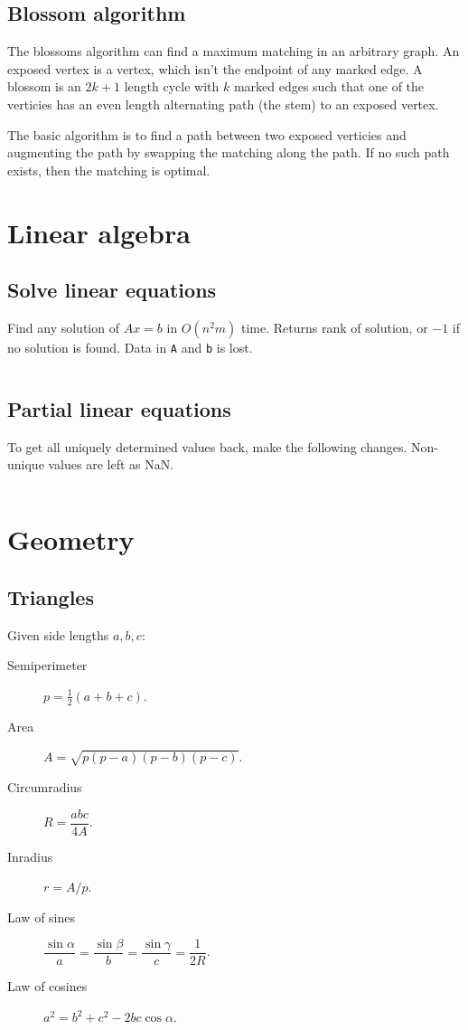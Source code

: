 \documentclass[10pt,a4paper,landscape,oneside]{amsart}
\newcommand{\code}[1]{\inputminted[fontsize=\large,tabsize=2,baselinestretch=1]{java}{#1}}
\begin{document}
\begin{multicols*}{2}
\subsection{Blossom algorithm}
The blossoms algorithm can find a maximum matching in an arbitrary graph. An exposed
vertex is a vertex, which isn't the endpoint of any marked edge. A blossom is an
\(2k+1\) length cycle with \(k\) marked edges such that one of the verticies has an even
length alternating path (the stem) to an exposed vertex.

The basic algorithm is to find a path between two exposed verticies and augmenting the
path by swapping the matching along the path. If no such path exists, then the matching
is optimal.

\section{Linear algebra}
\subsection{Solve linear equations}
Find any solution of \(Ax = b\) in \(O(n^2m)\) time. Returns rank of solution, or \(-1\)
if no solution is found. Data in \texttt{A} and \texttt{b} is lost.
\code{linear-algebra/linear-system.java}
\subsection{Partial linear equations}
To get all uniquely determined values back, make the following changes. Non-unique values
are left as NaN.
\code{linear-algebra/partial-linear-system.java}

\section{Geometry}
\subsection{Triangles}
Given side lengths \(a, b, c\):
\begin{description}
  \item[Semiperimeter] \(p = \tfrac{1}{2} (a+b+c)\).
  \item[Area] \(A = \sqrt{p (p-a)(p-b)(p-c)}\).
  \item[Circumradius] \(R = \dfrac{abc}{4A}\).
  \item[Inradius] \(r = A / p\).
  \item[Law of sines]
    \(\dfrac{\sin \alpha}a = \dfrac{\sin \beta}b = \dfrac{\sin \gamma}c = \dfrac1{2R}\).
  \item[Law of cosines] \(a^2 = b^2 + c^2 - 2bc \cos\alpha\).
\end{description}


\end{multicols*}
\end{document}
